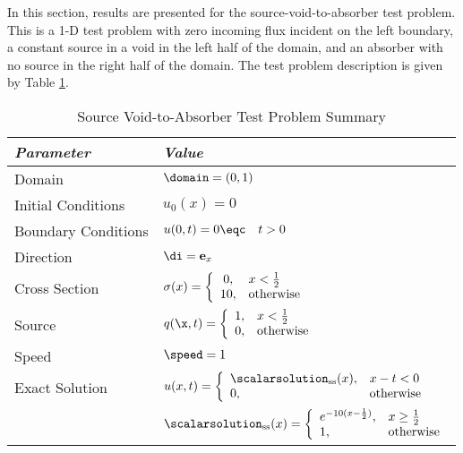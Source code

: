 In this section, results are presented for the
source-void-to-absorber test problem. This is a 1-D test problem
with zero incoming flux incident on the left boundary,
a constant source in a void in the left half of the
domain, and an absorber with no source in the right half of the
domain. The test problem description is given by Table
\ref{tab:source_void_to_absorber}.

\begin{table}[htb]\caption{Source Void-to-Absorber Test Problem Summary}
\label{tab:source_void_to_absorber}
\centering
\begin{tabular}{l l}\toprule
\emph{Parameter} & \emph{Value}\\\midrule
Domain & $\domain = (0,1)$\\
Initial Conditions & $u_0(x)=0$\\
Boundary Conditions & $u(0,t)=0 \eqc \quad t>0$\\
Direction & $\di = \mathbf{e}_x$\\
Cross Section & $\sigma(x)=\left\{\begin{array}{c l}
   0,  & x < \frac{1}{2}\\
   10, & \mbox{otherwise}\end{array}\right.$\\
Source & $q(\x,t)=\left\{\begin{array}{c l}
   1,  & x < \frac{1}{2}\\
   0,  & \mbox{otherwise}\end{array}\right.$\\
Speed & $\speed=1$\\
Exact Solution & $u(x,t)=\left\{\begin{array}{l l}
   \scalarsolution_{\text{ss}}(x), & x-t<0\\
   0, & \mbox{otherwise}
   \end{array}\right.$ \\
   & $\scalarsolution_{\text{ss}}(x) =
       \left\{\begin{array}{l l}
          e^{-10(x-\frac{1}{2})}, & x\ge\frac{1}{2}\\
          1,                      & \mbox{otherwise}
       \end{array}\right.$\\
\bottomrule\end{tabular}
\end{table}

